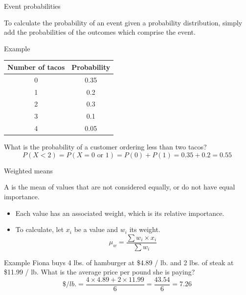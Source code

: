 \documentclass[xcolor=table, handout]{beamer}
\begin{document}
\begin{frame}{Event probabilities}
\begin{block}{}
To calculate the probability of an event given a probability distribution, simply add the probabilities of the outcomes which comprise the event.
\end{block}
\pause
\begin{exampleblock}{Example}
{\centering \renewcommand{\arraystretch}{1}
\begin{tabular}{c | c}
Number of tacos & Probability\\
\hline
0 & 0.35\\
1 & 0.2\\
2 & 0.3\\
3 & 0.1\\
4 & 0.05
\end{tabular}\par
\renewcommand{\arraystretch}{1.5}}
\bigskip
What is the probability of a customer ordering less than two tacos?
\pause\[P(X<2) = P(X = 0 \text{ or } 1) = P(0) + P(1) = 0.35 + 0.2 = 0.55 \]
\end{exampleblock}
\end{frame}

\begin{frame}{Weighted means}
\begin{block}{}
{\large A  is the mean of values that are not considered equally, or do not have equal importance.}
\begin{itemize}
\item Each value has an associated weight, which is its relative importance.
\item To calculate, let $x_i$ be a value and $w_i$ its weight.
\[\mu_w = \frac {\sum w_i \times x_i}{\sum w_i}\]
\end{itemize}
\end{block}
\pause
\begin{exampleblock}{Example}
Fiona buys 4 lbs. of hamburger at \$4.89 / lb. and 2 lbs. of steak at \$11.99 / lb. What is the average price per pound she is paying?
\[ \$/lb. = \frac {4 \times 4.89 + 2 \times 11.99}{6} = \frac {43.54}{6} = 7.26\]
\end{exampleblock}
\end{frame}
\end{document}
